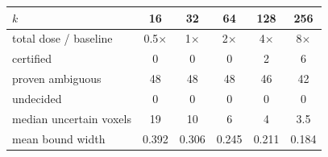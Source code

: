 \begin{tabular}{@{}lccccc@{}}\toprule
$k$ & 16 & 32 & 64 & 128 & 256\\\midrule
total dose / baseline & 0.5$\times$ & 1$\times$ & 2$\times$ & 4$\times$ & 8$\times$\\
certified & 0 & 0 & 0 & 2 & 6\\
proven ambiguous & 48 & 48 & 48 & 46 & 42\\
undecided & 0 & 0 & 0 & 0 & 0\\
median uncertain voxels & 19 & 10 & 6 & 4 & 3.5\\
mean bound width & 0.392 & 0.306 & 0.245 & 0.211 & 0.184\\
\bottomrule\end{tabular}

